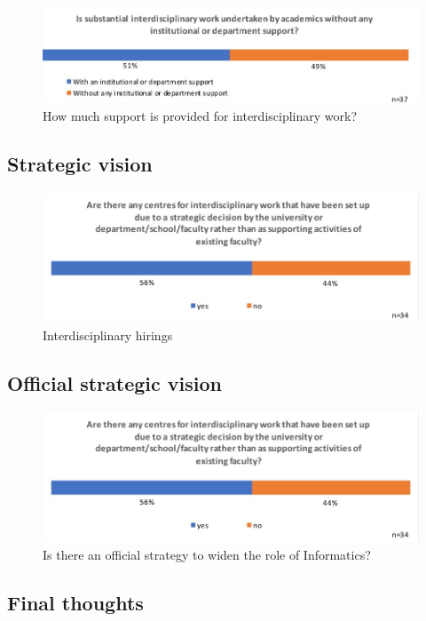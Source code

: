 \begin{figure}[h]
\centering
\includegraphics[width = \linewidth]{charts/5h.jpg}
\caption{How much support is provided for interdisciplinary work?}
\label{sect5:support}
\end{figure}

\subsection{Strategic vision }
\begin{figure}[h]
\centering
\includegraphics[width = \linewidth]{charts/5i.jpg}
\caption{Interdisciplinary hirings}
\label{sect5:strategy}
\end{figure}

\subsection{Official strategic vision}
\begin{figure}[h]
\centering
\includegraphics[width = \linewidth]{charts/5i.jpg}
\caption{Is there an official strategy to widen the role of Informatics?}
\label{sect5:official}
\end{figure}

\subsection{Final thoughts}





